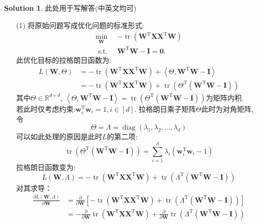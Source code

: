 \documentclass[a4paper,UTF8]{article}
\numberwithin{equation}{section}
\numberwithin{equation}{section}
\theoremstyle{definition}
\newtheorem*{solution}{Solution}
\begin{document}
\begin{solution}
    此处用于写解答(中英文均可)
    \begin{enumerate}
        \item [(1)]
        将原始问题写成优化问题的标准形式: 
        \begin{align*}
            \underset{\mathbf{W}}{\min }\ \ &  -\operatorname{tr}\left(\mathbf{W}^{\mathrm{T}} \mathbf{X} \mathbf{X}^{\mathrm{T}} \mathbf{W}\right)\\
            \text { s.t. }\ & \mathbf{W}^{\mathrm{T}} \mathbf{W} - \mathbf{I}= \boldsymbol{0}.
        \end{align*}
        此优化目标的拉格朗日函数为: 
        \begin{equation}
            \begin{aligned} L(\mathbf{W}, \Theta) & =-\operatorname{tr}\left(\mathbf{W}^{\mathrm{T}} \mathbf{X} \mathbf{X}^{\mathrm{T}} \mathbf{W}\right)+\left\langle\Theta, \mathbf{W}^{\mathrm{T}} \mathbf{W}-\mathbf{I}\right\rangle \\ & =-\operatorname{tr}\left(\mathbf{W}^{\mathrm{T}} \mathbf{X} \mathbf{X}^{\mathrm{T}} \mathbf{W}\right)+\operatorname{tr}\left(\Theta^{\mathrm{T}}\left(\mathbf{W}^{\mathrm{T}} \mathbf{W}-\mathbf{I}\right)\right)\nonumber\end{aligned}
        \end{equation}
        其中$\Theta \in \mathbb{R}^{d \times d}$, $\left\langle\Theta, \mathbf{W}^{\mathrm{T}} \mathbf{W}-\mathbf{I}\right\rangle=\operatorname{tr}\left(\Theta^{\mathrm{T}}\left(\mathbf{W}^{\mathrm{T}} \mathbf{W}-\mathbf{I}\right)\right)$为矩阵内积. \\
        若此时仅考虑约束:$\boldsymbol{w}_{i}^{\mathrm{T}} \boldsymbol{w}_{i}=1, i\in[d]$. 拉格朗日乘子矩阵$\Theta$此时为对角矩阵, 令 
        $$\Theta=\Lambda=\operatorname{diag}\left(\lambda_{1}, \lambda_{2}, \ldots, \lambda_{d}\right)$$
        可以如此处理的原因是此时$L$的第二项:
        $$\operatorname{tr}\left(\Theta^{\mathrm{T}}\left(\mathbf{W}^{\mathrm{T}} \mathbf{W}-\mathbf{I}\right)\right) = \sum\limits_{i=1}^d\lambda_{i}(\boldsymbol{w}_{i}^{\mathrm{T}} \boldsymbol{w}_{i}-1)$$
        拉格朗日函数变为:
        $$L(\mathbf{W}, \Lambda)=-\operatorname{tr}\left(\mathbf{W}^{\mathrm{T}} \mathbf{X} \mathbf{X}^{\mathrm{T}} \mathbf{W}\right)+\operatorname{tr}\left(\Lambda^{\mathrm{T}}\left(\mathbf{W}^{\mathrm{T}} \mathbf{W}-\mathbf{I}\right)\right)$$
        对其求导：
        \begin{align*} \frac{\partial L(\mathbf{W}, \Lambda)}{\partial \mathbf{W}} & =\frac{\partial}{\partial \mathbf{W}}\left[-\operatorname{tr}\left(\mathbf{W}^{\mathrm{T}} \mathbf{X} \mathbf{X}^{\mathrm{T}} \mathbf{W}\right)+\operatorname{tr}\left(\Lambda^{\mathrm{T}}\left(\mathbf{W}^{\mathrm{T}} \mathbf{W}-\mathbf{I}\right)\right)\right] \\ & =-\frac{\partial}{\partial \mathbf{W}} \operatorname{tr}\left(\mathbf{W}^{\mathrm{T}} \mathbf{X} \mathbf{X}^{\mathrm{T}} \mathbf{W}\right)+\frac{\partial}{\partial \mathbf{W}} \operatorname{tr}\left(\Lambda^{\mathrm{T}}\left(\mathbf{W}^{\mathrm{T}} \mathbf{W}-\mathbf{I}\right)\right)\end{align*}

\end{enumerate}
\end{solution}
\end{document}
